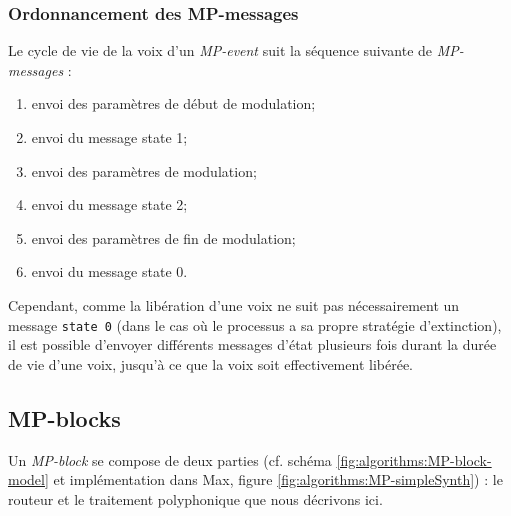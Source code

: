 \subsubsection{Ordonnancement des MP-messages}

\noindent Le cycle de vie de la voix d'un \textit{MP-event} suit la séquence suivante de \textit{MP-messages} :
\vspace{-1em}
\begin{enumerate}[noitemsep]
	\item envoi des paramètres de début de modulation;
	\item envoi du message state 1;
	\item envoi des paramètres de modulation;
	\item envoi du message state 2;
	\item envoi des paramètres de fin de modulation;
	\item envoi du message state 0.
\end{enumerate}
\noindent Cependant, comme la libération d'une voix ne suit pas nécessairement un message \verb|state 0| (dans le cas où le processus a sa propre stratégie d'extinction), il est possible d'envoyer différents messages d'état plusieurs fois durant la durée de vie d'une voix, jusqu'à ce que la voix soit effectivement libérée.

\subsection{MP-blocks}

\noindent Un \textit{MP-block} se compose de deux parties (cf. schéma \ref{fig:algorithms:MP-block-model} et implémentation dans Max, figure \ref{fig:algorithms:MP-simpleSynth}) : le routeur et le traitement polyphonique que nous décrivons ici.

